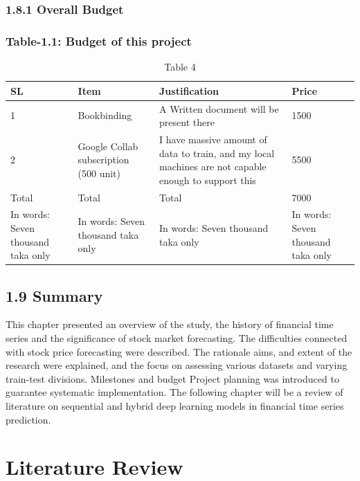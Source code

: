 \documentclass[12pt,a4paper]{report}
\begin{document}
\subsection{1.8.1 Overall Budget}
\subsection{Table-1.1: Budget of this project}
\begin{table}[htbp]
\centering
\begin{tabular}{|l|l|l|l|}
\hline
SL & Item & Justification & Price \\
\hline
1 & Bookbinding & A Written document will be present there & 1500 \\
\hline
2 & Google Collab subscription (500 unit) & I have massive amount of data to train, and my local machines are not capable enough to support this & 5500 \\
\hline
Total & Total & Total & 7000 \\
\hline
In words: Seven thousand taka only & In words: Seven thousand taka only & In words: Seven thousand taka only & In words: Seven thousand taka only \\
\hline
\end{tabular}
\caption{Table 4}
\label{tab:table4}
\end{table}

\section{1.9 Summary}
This chapter presented an overview of the study, the history of financial time series and the significance of stock market forecasting. The difficulties connected with stock price forecasting were described. The rationale aims, and extent of the research were explained, and the focus on assessing various datasets and varying train-test divisions. Milestones and budget Project planning was introduced to guarantee systematic implementation. The following chapter will be a review of literature on sequential and hybrid deep learning models in financial time series prediction.

\chapter{Literature Review}
\label{ch:2}
\end{document}
